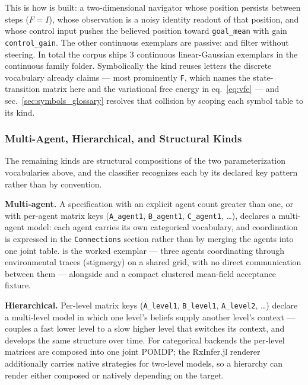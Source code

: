 \documentclass[
  english,
  9pt,
]{extarticle}
\begin{document}
This is how
 is built:
a two-dimensional navigator whose position persists between steps
(\(F = I\)), whose observation is a noisy identity readout of that
position, and whose control input pushes the believed position toward
\texttt{goal\_mean} with gain \texttt{control\_gain}. The other
continuous exemplars are passive: 
and  filter without steering. In total
the corpus ships 3 continuous linear-Gaussian exemplars in the
continuous family folder. Symbolically the kind reuses letters the
discrete vocabulary already claims --- most prominently \texttt{F},
which names the state-transition matrix here and the variational free
energy in eq.~\ref{eq:vfe} --- and sec.~\ref{sec:symbols_glossary}
resolves that collision by scoping each symbol table to its kind.

\subsubsection{Multi-Agent, Hierarchical, and Structural
Kinds}\label{sec:structural_variants}

The remaining kinds are structural compositions of the two
parameterization vocabularies above, and the classifier recognizes each
by its declared key pattern rather than by convention.

\textbf{Multi-agent.} A specification with an explicit agent count
greater than one, or with per-agent matrix keys (\texttt{A\_agent1},
\texttt{B\_agent1}, \texttt{C\_agent1}, \ldots), declares a multi-agent
model: each agent carries its own categorical vocabulary, and
coordination is expressed in the \texttt{Connections} section rather
than by merging the agents into one joint table.
 is the worked
exemplar --- three agents coordinating through environmental traces
(stigmergy) on a shared grid, with no direct communication between them
--- alongside  and a compact
clustered mean-field acceptance fixture.

\textbf{Hierarchical.} Per-level matrix keys (\texttt{A\_level1},
\texttt{B\_level1}, \texttt{A\_level2}, \ldots) declare a multi-level
model in which one level's beliefs supply another level's context ---
 couples a
fast lower level to a slow higher level that switches its context, and
 develops the same structure over time.
For categorical backends the per-level matrices are composed into one
joint POMDP; the RxInfer.jl renderer additionally carries native
strategies for two-level models, so a hierarchy can render either
composed or natively depending on the target.
\end{document}
